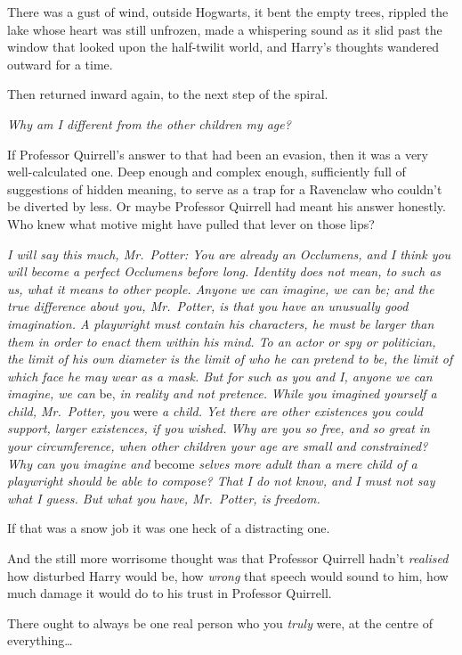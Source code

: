 There was a gust of wind, outside Hogwarts, it bent the empty trees,
rippled the lake whose heart was still unfrozen, made a whispering sound
as it slid past the window that looked upon the half-twilit world, and
Harry's thoughts wandered outward for a time.

Then returned inward again, to the next step of the spiral.

\emph{Why am I different from the other children my age?}

If Professor Quirrell's answer to that had been an evasion, then it was
a very well-calculated one. Deep enough and complex enough, sufficiently
full of suggestions of hidden meaning, to serve as a trap for a
Ravenclaw who couldn't be diverted by less. Or maybe Professor Quirrell
had meant his answer honestly. Who knew what motive might have pulled
that lever on those lips?

\emph{I will say this much, Mr.~Potter: You are already an Occlumens,
and I think you will become a perfect Occlumens before long. Identity
does not mean, to such as us, what it means to other people. Anyone we
can imagine, we can be; and the true difference about you, Mr.~Potter,
is that you have an unusually good imagination. A playwright must
contain his characters, he must be larger than them in order to enact
them within his mind. To an actor or spy or politician, the limit of his
own diameter is the limit of who he can pretend to be, the limit of
which face he may wear as a mask. But for such as you and I, anyone we
can imagine, we can} be, \emph{in reality and not pretence.} \emph{While
you imagined yourself a child, Mr.~Potter, you} were \emph{a child. Yet
there are other existences you could support, larger existences, if you
wished. Why are you so free, and so great in your circumference, when
other children your age are small and constrained? Why can you imagine
and} become \emph{selves more adult than a mere child of a playwright
should be able to compose? That I do not know, and I must not say what I
guess. But what you have, Mr.~Potter, is freedom.}

If that was a snow job it was one heck of a distracting one.

And the still more worrisome thought was that Professor Quirrell hadn't
\emph{realised} how disturbed Harry would be, how \emph{wrong} that
speech would sound to him, how much damage it would do to his trust in
Professor Quirrell.

There ought to always be one real person who you \emph{truly} were, at
the centre of everything\ldots{}

